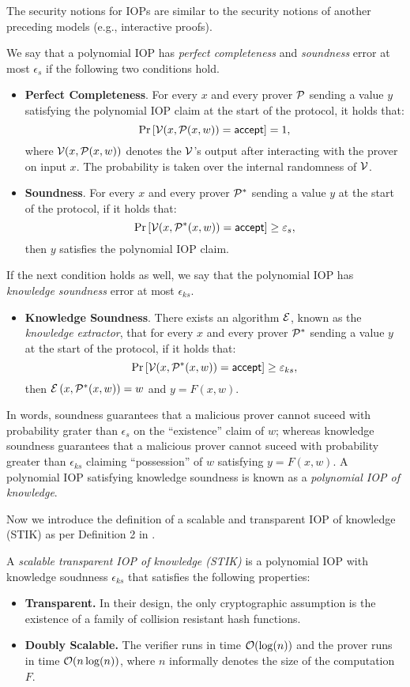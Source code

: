 The security notions for IOPs are similar to the security notions of another preceding models (e.g., interactive proofs).
\begin{definition}
  We say that a polynomial IOP has \textit{perfect completeness} and \textit{soundness} error at most $\epsilon_s$ if the following two conditions hold. 
  \begin{itemize}
    \item \textbf{Perfect Completeness}. For every $x$ and every prover $\P$ sending a value $y$ satisfying the polynomial IOP claim at the start of the protocol, it holds that:
    \[
      \Pr\left[\V(x,\P(x,w)) = \accept\right] = 1,
    \]
    where $\V(x,\P(x,w))$ denotes the $\V$'s output after interacting with the prover on input $x$. The probability is taken over the internal randomness of $\V$.
    \item \textbf{Soundness}. For every $x$ and every prover $\P^*$ sending a value $y$ at the start of the protocol, if it holds that:
    \[
      \Pr\left[\V(x,\P^*(x,w)) = \accept\right] \geq \epsilon_s,
    \]
    then $y$ satisfies the polynomial IOP claim.
  \end{itemize}
If the next condition holds as well, we say that the polynomial IOP has \textit{knowledge soundness} error at most $\epsilon_{ks}$.
  \begin{itemize}
    \item \textbf{Knowledge Soundness}. There exists an algorithm $\E$, known as the \textit{knowledge extractor}, that for every $x$ and every prover $\P^*$ sending a value $y$ at the start of the protocol, if it holds that:
    \[
      \Pr\left[\V(x,\P^*(x,w)) = \accept\right] \geq \epsilon_{ks},
    \]
    then $\E\left(x,\P^*(x,w)\right) = w$ and $y = F(x,w)$.
  \end{itemize}
  In words, soundness guarantees that a malicious prover cannot suceed with probability grater than $\epsilon_s$ on the ``existence'' claim of $w$; whereas knowledge soundness guarantees that a malicious prover cannot suceed with probability greater than $\epsilon_{ks}$ claiming ``possession'' of $w$ satisfying $y = F(x,w)$. A polynomial IOP satisfying knowledge soundness is known as a \textit{polynomial IOP of knowledge}.
\end{definition}


Now we introduce the definition of a scalable and transparent IOP of knowledge (STIK) as per Definition 2 in \cite{C:BBHR19}.
\begin{definition}[STIK]
  A \textit{scalable transparent IOP of knowledge (STIK)} is a polynomial IOP with knowledge soudnness $\epsilon_{ks}$ that satisfies the following properties:
  \begin{itemize}
    \item \textbf{Transparent.} In their design, the only cryptographic assumption is the existence of a family of collision resistant hash functions.  
    \item \textbf{Doubly Scalable.} The verifier runs in time $\O(\log(n))$ and the prover runs in time $\O(n\log(n))$, where $n$ informally denotes the size of the computation $F$.
  \end{itemize}
\end{definition}

